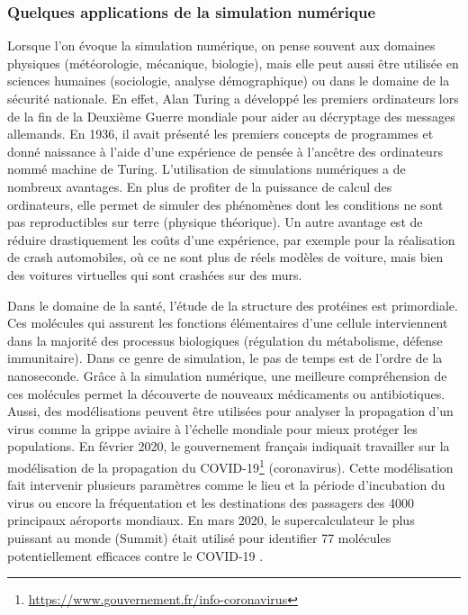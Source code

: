     
    \subsubsection{Quelques applications de la simulation numérique}
        Lorsque l'on évoque la simulation numérique, on pense souvent aux domaines physiques (météorologie, mécanique, biologie), mais elle peut aussi être utilisée en sciences humaines (sociologie, analyse démographique) ou dans le domaine de la sécurité nationale. En effet, Alan Turing a développé les premiers ordinateurs lors de la fin de la Deuxième Guerre mondiale pour aider au décryptage des messages allemands. En 1936, il avait présenté les premiers concepts de programmes et donné naissance à l'aide d'une expérience de pensée à l'ancêtre des ordinateurs nommé machine de Turing. L'utilisation de simulations numériques a de nombreux avantages. En plus de profiter de la puissance de calcul des ordinateurs, elle permet de simuler des phénomènes dont les conditions ne sont pas reproductibles sur terre (physique théorique). Un autre avantage est de réduire drastiquement les coûts d'une expérience, par exemple pour la réalisation de crash automobiles, où ce ne sont plus de réels modèles de voiture, mais bien des voitures virtuelles qui sont crashées sur des murs.
        
        Dans le domaine de la santé, l'étude de la structure des protéines est primordiale.  Ces molécules qui assurent les fonctions élémentaires d'une cellule interviennent dans la majorité des processus biologiques (régulation du métabolisme, défense immunitaire). Dans ce genre de simulation, le pas de temps est de l'ordre de la nanoseconde. Grâce à la simulation numérique, une meilleure compréhension de ces molécules permet la découverte de nouveaux médicaments ou antibiotiques. 
        Aussi, des modélisations peuvent être utilisées pour analyser la propagation d'un virus comme la grippe aviaire à l'échelle mondiale pour mieux protéger les populations\cite{CEA2007}. En février 2020, le gouvernement français indiquait travailler sur la modélisation de la propagation du COVID-19\footnote{\url{https://www.gouvernement.fr/info-coronavirus}} (coronavirus). Cette modélisation fait intervenir plusieurs paramètres comme le lieu et la période d'incubation du virus ou encore la fréquentation et les destinations des passagers des 4000 principaux aéroports mondiaux. En mars 2020, le supercalculateur le plus puissant au monde (Summit) était utilisé pour identifier 77 molécules potentiellement efficaces contre le COVID-19 \cite{Smith2020}.

